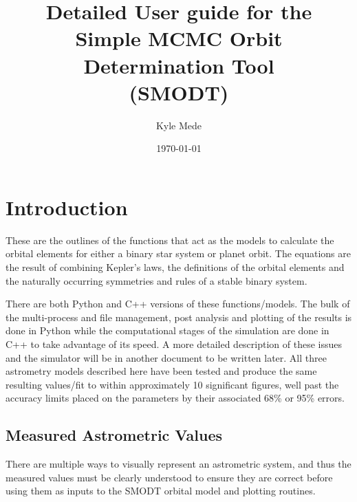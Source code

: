 \documentclass[12pt,preprint]{aastex}
\title{Detailed User guide for the \\ Simple MCMC Orbit Determination Tool \\(SMODT)}
\author{Kyle Mede}
\date{\today}
\begin{document}
\maketitle

\tableofcontents


\section{Introduction}

These are the outlines of the functions that act as the models to calculate the orbital elements for either a binary star system or planet orbit.  The equations are the result of combining Kepler's laws, the definitions of the orbital elements and the naturally occurring symmetries and rules of a stable binary system.

There are both Python and C++ versions of these functions/models.  The bulk of the multi-process and file management,  post analysis and plotting of the results is done in Python while the computational stages of the simulation are done in C++ to take advantage of its speed.  A more detailed description of these issues and the simulator will be in another document to be written later.  All three astrometry models described here have been tested and produce the same resulting values/fit to within approximately 10 significant figures, well past the accuracy limits placed on the parameters by their associated 68\% or 95\% errors.

%
\pagebreak
\subsection{Measured Astrometric Values}\label{sec:MeasAstrometry}

There are multiple ways to visually represent an astrometric system, and thus the measured values must be clearly understood to ensure they are correct before using them as inputs to the SMODT orbital model and plotting routines.
\end{document}
